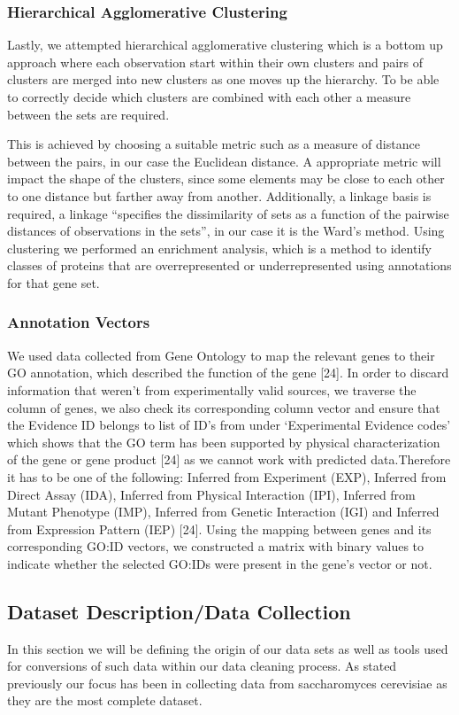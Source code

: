 \documentclass[9pt]{article}
\begin{document}
\subsubsection{Hierarchical Agglomerative Clustering}
Lastly, we attempted hierarchical agglomerative clustering which is a bottom up approach where each observation start within their own clusters and pairs of clusters are merged into new clusters as one moves up the hierarchy. To be able to correctly decide which clusters are combined with each other a measure between the sets are required. 

This is achieved by choosing a suitable metric such as a measure of distance between the pairs, in our case the Euclidean distance. A appropriate metric will impact the shape of the clusters, since some elements may be close to each other to one distance but farther away from another. Additionally, a linkage basis is required, a linkage “specifies the dissimilarity of sets as a function of the pairwise distances of observations in the sets”, in our case it is the Ward’s method.  Using clustering we performed an enrichment analysis, which is a method to identify classes of proteins that are overrepresented or underrepresented using annotations for that gene set. 

\subsubsection{Annotation Vectors}
We used data collected from Gene Ontology to map the relevant genes to their GO annotation, which described the function of the gene [24].
In order to discard information that weren’t from experimentally valid sources, we traverse the column of genes, we also check its corresponding column vector and ensure that the Evidence ID belongs to list of ID’s from under ‘Experimental Evidence codes’ which shows that the GO term has been supported by physical characterization of the gene or gene product [24] as we cannot work with predicted data.Therefore it has to be one of the following: Inferred from Experiment (EXP), Inferred from Direct Assay (IDA), Inferred from Physical Interaction (IPI), Inferred from Mutant Phenotype (IMP), Inferred from Genetic Interaction (IGI) and Inferred from Expression Pattern (IEP) [24]. Using the mapping between genes and its corresponding GO:ID vectors, we constructed a matrix with binary values to indicate whether the selected GO:IDs were present in the gene’s vector or not.

\subsection{Dataset Description/Data Collection}
In this section we will be defining the origin of our data sets as well as tools used for conversions of such data within our data cleaning process. As stated previously our focus has been in collecting data from saccharomyces cerevisiae as they are the most complete dataset.
\end{document}
